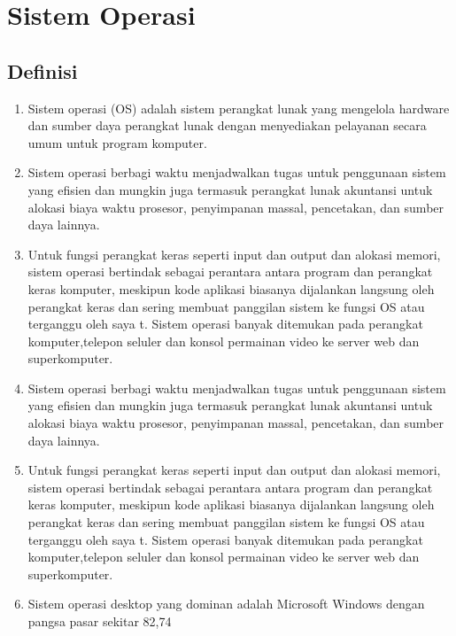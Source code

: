 \section{Sistem Operasi}
	\subsection{Definisi}
		\begin{enumerate}
			\item Sistem operasi (OS) adalah sistem perangkat lunak yang mengelola hardware dan sumber daya perangkat lunak dengan menyediakan pelayanan secara umum untuk program komputer.

			\item Sistem operasi berbagi waktu menjadwalkan tugas untuk penggunaan sistem yang efisien dan mungkin juga termasuk perangkat lunak akuntansi untuk alokasi biaya waktu prosesor, penyimpanan massal, pencetakan, dan sumber daya lainnya.
			\item Untuk fungsi perangkat keras seperti input dan output dan alokasi memori, sistem operasi bertindak sebagai perantara antara program dan perangkat keras komputer, meskipun kode aplikasi biasanya dijalankan langsung oleh perangkat keras dan sering membuat panggilan sistem ke fungsi OS atau terganggu oleh saya t. Sistem operasi banyak ditemukan pada perangkat komputer,telepon seluler dan konsol permainan video ke server web dan superkomputer.

			\item Sistem operasi berbagi waktu menjadwalkan tugas untuk penggunaan sistem yang efisien dan mungkin juga termasuk perangkat lunak akuntansi untuk alokasi biaya waktu prosesor, penyimpanan massal, pencetakan, dan sumber daya lainnya.
			\item Untuk fungsi perangkat keras seperti input dan output dan alokasi memori, sistem operasi bertindak sebagai perantara antara program dan perangkat keras komputer, meskipun kode aplikasi biasanya dijalankan langsung oleh perangkat keras dan sering membuat panggilan sistem ke fungsi OS atau terganggu oleh saya t. Sistem operasi banyak ditemukan pada perangkat komputer,telepon seluler dan konsol permainan video ke server web dan superkomputer.

			\item Sistem operasi desktop yang dominan adalah Microsoft Windows dengan pangsa pasar sekitar 82,74%
		\end{enumerate}
